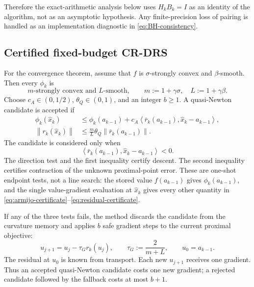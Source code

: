 \documentclass[10pt,leqno]{amsart}
\numberwithin{equation}{section}
\numberwithin{algorithm}{section}
\theoremstyle{remark}
\newcommand{\norm}[1]{\left\lVert #1 \right\rVert}
\newcommand{\ip}[2]{\left\langle #1,#2 \right\rangle}
\begin{document}
Therefore the exact-arithmetic analysis below uses $H_kB_k=I$ as an identity of the algorithm, not as an asymptotic hypothesis.  Any finite-precision loss of pairing is handled as an implementation diagnostic in \eqref{eq:BH-consistency}.

\subsection{Certified fixed-budget CR-DRS}
\label{sec:certified-algorithm}

For the convergence theorem, assume that $f$ is $\sigma$-strongly convex and $\beta$-smooth.  Then every $\phi_k$ is
\begin{equation}
\label{eq:m-L-prox}
    m\text{-strongly convex and }L\text{-smooth},
    \qquad
    m:=1+\gamma\sigma,
    \quad
    L:=1+\gamma\beta.
\end{equation}
Choose $c_A\in(0,1/2)$, $\theta_Q\in(0,1)$, and an integer $b\ge1$.  A quasi-Newton candidate is accepted if
\begin{align}
    \phi_k(\widehat x_k)
    &\le \phi_k(a_{k-1})
      +c_A\ip{\bar r_k(a_{k-1})}{\widehat x_k-a_{k-1}},
    \label{eq:armijo-certificate}\\
    \norm{r_k(\widehat x_k)}
    &\le \frac{m}{L}\theta_Q
       \norm{\bar r_k(a_{k-1})}.
    \label{eq:residual-certificate}
\end{align}
The candidate is considered only when
\begin{equation}
\label{eq:descent-direction-certificate}
    \ip{\bar r_k(a_{k-1})}{\widehat x_k-a_{k-1}}<0.
\end{equation}
The direction test and the first inequality certify descent.  The second inequality certifies contraction of the unknown proximal-point error.  These are one-shot endpoint tests, not a line search: the stored value $f(a_{k-1})$ gives $\phi_k(a_{k-1})$, and the single value-gradient evaluation at $\widehat x_k$ gives every other quantity in \eqref{eq:armijo-certificate}--\eqref{eq:residual-certificate}.

If any of the three tests fails, the method discards the candidate from the curvature memory and applies $b$ safe gradient steps to the current proximal objective:
\begin{equation}
\label{eq:safe-gradient-step}
    u_{j+1}=u_j-\tau_G r_k(u_j),
    \qquad
    \tau_G:=\frac{2}{m+L},
    \qquad
    u_0=a_{k-1}.
\end{equation}
The residual at $u_0$ is known from transport.  Each new $u_{j+1}$ receives one gradient.  Thus an accepted quasi-Newton candidate costs one new gradient; a rejected candidate followed by the fallback costs at most $b+1$.
\end{document}
